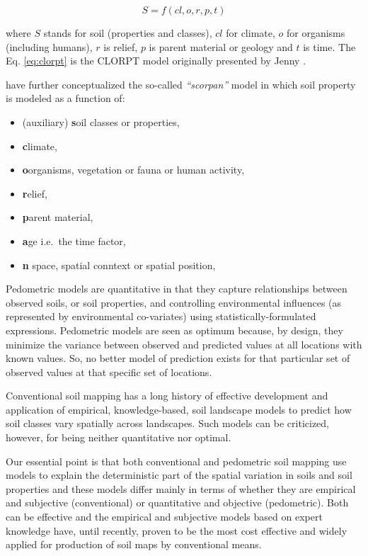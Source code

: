 \documentclass[graybox,natbib,nospthms,UStrade]{svmono}
\begin{document}
\begin{equation}
S = f (cl, o, r, p, t)
\label{eq:clorpt}
\end{equation}

where \(S\) stands for soil (properties and classes), \(cl\) for climate,
\(o\) for organisms (including humans), \(r\) is relief, \(p\) is parent
material or geology and \(t\) is time. The Eq. \eqref{eq:clorpt} is the
CLORPT model originally presented by Jenny \citeyearpar{jenny1994factors}.

\citet{MCBRATNEY20033} have further conceptualized the so-called
\emph{``scorpan''} model in which soil property is modeled as a function of:

\begin{itemize}
\item
  (auxiliary) \textbf{s}oil classes or properties,
\item
  \textbf{c}limate,
\item
  \textbf{o}organisms, vegetation or fauna or human activity,
\item
  \textbf{r}elief,
\item
  \textbf{p}arent material,
\item
  \textbf{a}ge i.e.~the time factor,
\item
  \textbf{n} space, spatial conntext or spatial position,
\end{itemize}

Pedometric models are quantitative in that they capture
relationships between observed soils, or soil properties, and
controlling environmental influences (as represented by environmental
co-variates) using statistically-formulated expressions. Pedometric
models are seen as optimum because, by design, they minimize the
variance between observed and predicted values at all locations with
known values. So, no better model of prediction exists for that
particular set of observed values at that specific set of locations.

Conventional soil mapping has a long history of effective development
and application of empirical, knowledge-based, soil landscape models to
predict how soil classes vary spatially across landscapes. Such models
can be criticized, however, for being neither quantitative nor optimal.

Our essential point is that both conventional and pedometric soil
mapping use models to explain the deterministic part of the spatial
variation in soils and soil properties and these models differ mainly in
terms of whether they are empirical and subjective (conventional) or
quantitative and objective (pedometric). Both can be effective and the
empirical and subjective models based on expert knowledge have, until
recently, proven to be the most cost effective and widely applied for
production of soil maps by conventional means.
\end{document}

